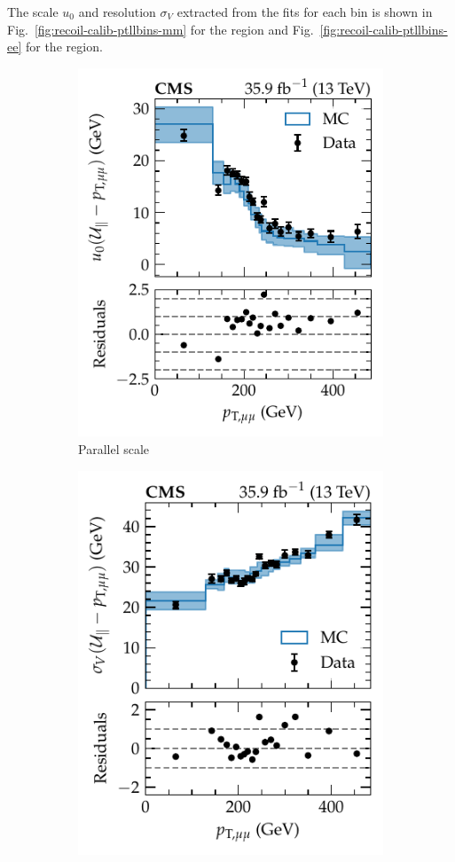The scale $u_0$ and resolution $\sigma_V$ extracted from the fits for each \ptll bin is shown in Fig.~\ref{fig:recoil-calib-ptllbins-mm} for the \dimuplusjets region and Fig.~\ref{fig:recoil-calib-ptllbins-ee} for the \dieleplusjets region.
%
\begin{figure}[htb]
    \centering
    \begin{subfigure}[b]{0.49\textwidth}
        \centering
        \includegraphics{chapters/041_corrections/images/ptmiss_calib/metres_mm_u0_para.pdf}
        \caption{Parallel scale}
        \label{subfiga:recoil-calib-ptllbins-mm}
    \end{subfigure}
    \hfill
    \begin{subfigure}[b]{0.49\textwidth}
        \centering
        \includegraphics{chapters/041_corrections/images/ptmiss_calib/metres_mm_sigmav_para.pdf}

\end{subfigure}
\end{figure}
